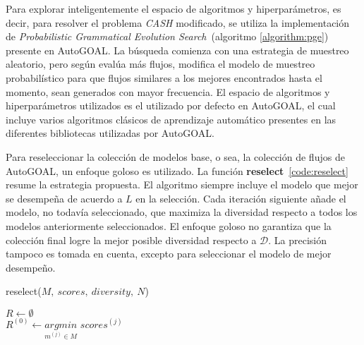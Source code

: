 Para explorar inteligentemente  el espacio de algoritmos y hiperparámetros, es decir, para resolver el problema \textit{CASH} modificado, se utiliza la implementación de \emph{Probabilistic Grammatical Evolution Search}~(algoritmo \ref{algorithm:pge}) presente en AutoGOAL.
La búsqueda comienza con una estrategia de muestreo aleatorio, pero según evalúa más flujos, modifica el modelo de muestreo probabilístico para que flujos similares a los mejores encontrados hasta el momento, sean generados con mayor frecuencia.
El espacio de algoritmos y hiperparámetros utilizados es el utilizado por defecto en AutoGOAL, el cual incluye varios algoritmos clásicos de aprendizaje automático presentes en las diferentes bibliotecas utilizadas por AutoGOAL.

Para reseleccionar la colección de modelos base, o sea, la colección de flujos de AutoGOAL, un enfoque goloso es utilizado.
La función \textbf{reselect}~\ref{code:reselect} resume la estrategia propuesta.
El algoritmo siempre incluye el modelo que mejor se desempeña de acuerdo a $L$ en la selección. Cada iteración siguiente añade el modelo, no todavía seleccionado, que maximiza la diversidad respecto a todos los modelos anteriormente seleccionados.
El enfoque goloso no garantiza que la colección final logre la mejor posible diversidad respecto a $\mathcal{D}$.
La precisión tampoco es tomada en cuenta, excepto para seleccionar el modelo de mejor desempeño.

\begin{function}[htb!]
    \caption{reselect($M,\ scores,\ diversity,\ N$)\label{code:reselect}}

    \init $R \leftarrow \emptyset$ \\
    \init $R^{(0)} \leftarrow \underset{m^{(j)} \in M}{argmin}$ $scores^{(j)}$ \\

\end{function}

